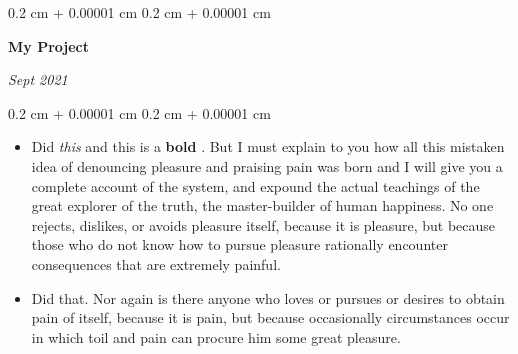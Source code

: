 \documentclass[10pt, letterpaper]{article}
\newenvironment{highlights}{
    \begin{itemize}[
        topsep=0.10 cm,
        parsep=0.10 cm,
        partopsep=0pt,
        itemsep=0pt,
        leftmargin=0.4 cm + 10pt
    ]
}{
    \end{itemize}
} %
\newenvironment{onecolentry}{
    \begin{adjustwidth}{
        0.2 cm + 0.00001 cm
    }{
        0.2 cm + 0.00001 cm
    }
}{
    \end{adjustwidth}
} %
\newenvironment{twocolentry}[2][]{
    \onecolentry
    \def\secondColumn{#2}
    \setcolumnwidth{\fill, 4.5 cm}
    \begin{paracol}{2}
}{
    \switchcolumn \raggedleft \secondColumn
    \end{paracol}
    \endonecolentry
} %
\let\hrefWithoutArrow\href
\renewcommand{\href}[2]{\hrefWithoutArrow{#1}{\ifthenelse{\equal{#2}{}}{ }{#2 }\raisebox{.15ex}{\footnotesize \faExternalLink*}}}
\begin{document}
        \begin{twocolentry}{
            
            
        \textit{Sept 2021}}
            \textbf{My Project}
        \end{twocolentry}
        \vspace{0.10 cm}
        \begin{onecolentry}
            \begin{highlights}
                \item Did \textit{this} and this is a \textbf{bold} \href{https://example.com}{link}. But I must explain to you how all this mistaken idea of denouncing pleasure and praising pain was born and I will give you a complete account of the system, and expound the actual teachings of the great explorer of the truth, the master-builder of human happiness. No one rejects, dislikes, or avoids pleasure itself, because it is pleasure, but because those who do not know how to pursue pleasure rationally encounter consequences that are extremely painful.
                \item Did that. Nor again is there anyone who loves or pursues or desires to obtain pain of itself, because it is pain, but because occasionally circumstances occur in which toil and pain can procure him some great pleasure.
            \end{highlights}
        \end{onecolentry}


        \vspace{0.2 cm}
\end{document}
